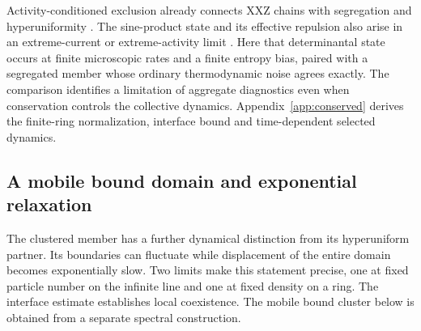 \documentclass[aps,pre,reprint,amsmath,amssymb,longbibliography,floatfix]{revtex4-2}
\begin{document}
Activity-conditioned exclusion already connects XXZ chains with
segregation and hyperuniformity
\cite{LecomteGarrahanVanWijland2012,JackThompsonSollich2015}.
The sine-product state and its effective repulsion also arise in an
extreme-current or extreme-activity limit
\cite{PopkovSchutzSimon2010,PopkovSchutz2011}.
Here that determinantal state occurs at finite microscopic rates and a
finite entropy bias, paired with a segregated member whose ordinary
thermodynamic noise agrees exactly. The comparison identifies a
limitation of aggregate diagnostics even when conservation controls the
collective dynamics. Appendix~\ref{app:conserved} derives the finite-ring
normalization, interface bound and time-dependent selected dynamics.

\subsection{A mobile bound domain and exponential relaxation}
\label{sec:droplet-transport}

The clustered member has a further dynamical distinction from its
hyperuniform partner. Its boundaries can fluctuate while displacement of
the entire domain becomes exponentially slow. Two limits make this
statement precise, one at fixed particle number on the infinite line
and one at fixed density on a ring.
The interface estimate establishes local coexistence. The mobile
bound cluster below is obtained from a separate spectral construction.
\end{document}
